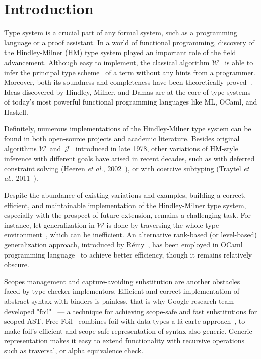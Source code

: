 \chapter{Introduction}
\label{chap:intro}

Type system is a crucial part of any formal system, such as a programming language or a proof assistant. In a world of functional programming, discovery of the Hindley-Milner (HM) type system played an important role of the field advancement. Although easy to implement, the classical algorithm $\mathcal{W}$~\cite{Milner1978_TypePolymorphism} is able to infer the principal type scheme~\cite{Hindley1969_PrincipalTypeScheme} of a term without any hints from a programmer. Moreover, both its soundness and completeness have been theoretically proved~\cite{Damas1984_TypeAssignment}. Ideas discovered by Hindley, Milner, and Damas are at the core of type systems of today's most powerful functional programming languages like ML, OCaml, and Haskell.

Definitely, numerous implementations of the Hindley-Milner type system can be found in both open-source projects and academic literature. Besides original algorithms $\mathcal{W}$~and~$\mathcal{J}$~\cite{Milner1978_TypePolymorphism} introduced in late 1978, other variations of HM-style inference with different goals have arised in recent decades, such as with deferred constraint solving (Heeren \textit{et al.}, 2002~\cite{Heeren2002_GeneralizingHM}), or with coercive subtyping (Traytel \textit{et al.}, 2011~\cite{Traytel2011_HMCoerciveSubtyping}).

Despite the abundance of existing variations and examples, building a correct, efficient, and maintainable implementation of the Hindley-Milner type system, especially with the prospect of future extension, remains a challenging task. For instance, let-generalization in $\mathcal{W}$ is done by traversing the whole type environment~\cite{DamasMilner1982_TypeSchemes}, which can be inefficient. An alternative rank-based (or level-based) generalization approach, introduced by R\'emy~\cite{Remy1992_SortedEqTheoryTypes}, has been employed in OCaml programming language~\cite{Kiselyov2022_OCamplTypeChecker} to achieve better efficiency, though it remains relatively obscure.

Scopes management and capture-avoiding substitution are another obstacles faced by type checker implementors. Efficient and correct implementation of abstract syntax with binders is painless, that is why Google research team developed "foil"~\cite{Foil} — a technique for achieving scope-safe and fast substitutions for scoped AST. Free Foil~\cite{FreeFoil} combines foil with data types a l\'a carte approach~\cite{Swierstra2008_a_la_carte}, to make foil's efficient and scope-safe representation of syntax also generic. Generic representation makes it easy to extend functionality with recursive operations such as traversal, or alpha equivalence check.

